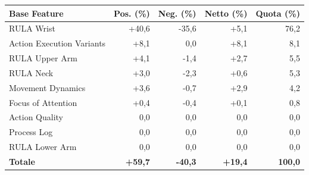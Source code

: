 \begin{tabular*}{\linewidth}{@{}l@{\extracolsep{\fill}}rrrr@{}}
\toprule
\textbf{Base Feature} & \textbf{Pos. (\%)} & \textbf{Neg. (\%)} & \textbf{Netto (\%)} & \textbf{Quota (\%)} \\
\midrule
RULA Wrist & +40{,}6 & -35{,}6 & +5{,}1 & 76{,}2 \\
Action Execution Variants & +8{,}1 & 0{,}0 & +8{,}1 & 8{,}1 \\
RULA Upper Arm & +4{,}1 & -1{,}4 & +2{,}7 & 5{,}5 \\
RULA Neck & +3{,}0 & -2{,}3 & +0{,}6 & 5{,}3 \\
Movement Dynamics & +3{,}6 & -0{,}7 & +2{,}9 & 4{,}2 \\
Focus of Attention & +0{,}4 & -0{,}4 & +0{,}1 & 0{,}8 \\
Action Quality & 0{,}0 & 0{,}0 & 0{,}0 & 0{,}0 \\
Process Log & 0{,}0 & 0{,}0 & 0{,}0 & 0{,}0 \\
RULA Lower Arm & 0{,}0 & 0{,}0 & 0{,}0 & 0{,}0 \\
\midrule
\textbf{Totale} & \textbf{+59{,}7} & \textbf{-40{,}3} & \textbf{+19{,}4} & \textbf{100{,}0} \\
\bottomrule
\end{tabular*}
